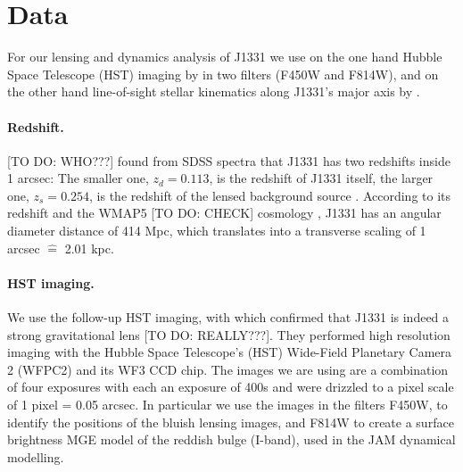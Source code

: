 \section{Data} \label{sec:data}

For our lensing and dynamics analysis of J1331 we use on the one hand Hubble Space Telescope (HST) imaging by \cite{SWELLSI} in two filters (F450W and F814W), and on the other hand line-of-sight stellar kinematics along J1331's major axis by \citet{SWELLSV}.

\paragraph{Redshift.} [TO DO: WHO???] found from SDSS spectra that J1331 has two redshifts inside 1 arcsec: The smaller one, $z_d = 0.113$, is the redshift of J1331 itself, the larger one, $z_s = 0.254$, is the redshift of the lensed background source \citep{SWELLSIII}. According to its redshift and the WMAP5 [TO DO: CHECK] cosmology \citep{WMAP5cosm}, J1331 has an angular diameter distance of 414 Mpc, which translates into a transverse scaling of 1 arcsec $\hat{=}$ 2.01 kpc.

\paragraph{HST imaging.} We use the follow-up HST imaging, with which \citet{SWELLSI} confirmed that J1331 is indeed a strong gravitational lens [TO DO: REALLY???]. They performed high resolution imaging with the Hubble Space Telescope's (HST) Wide-Field Planetary Camera 2 (WFPC2) and its WF3 CCD chip.  The images we are using are a combination of four exposures with each an exposure of 400s and were drizzled to a pixel scale of 1 pixel = 0.05 arcsec. In particular we use the images in the filters F450W, to identify the positions of the bluish lensing images, and F814W to create a surface brightness MGE model of the reddish bulge (I-band), used in the JAM dynamical modelling.

